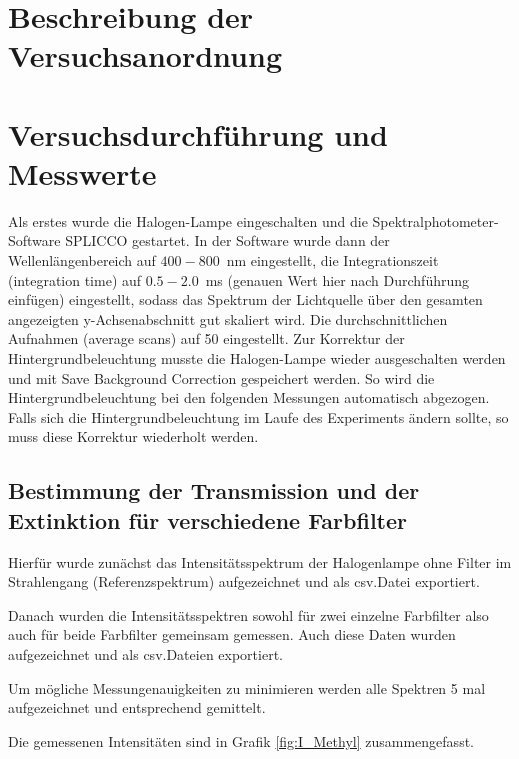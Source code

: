 \documentclass{article}
\begin{document}
\section{Beschreibung der Versuchsanordnung}

\section{Versuchsdurchführung und Messwerte}

Als erstes wurde die Halogen-Lampe eingeschalten und die Spektralphotometer-Software SPLICCO gestartet. In der Software wurde dann der Wellenlängenbereich auf $400-800$~nm eingestellt, die Integrationszeit (integration time) auf $0.5-2.0$~ms (genauen Wert hier nach Durchführung einfügen) eingestellt, sodass das Spektrum der Lichtquelle über den gesamten angezeigten y-Achsenabschnitt gut skaliert wird. Die durchschnittlichen Aufnahmen (average scans) auf 50 eingestellt.
Zur Korrektur der Hintergrundbeleuchtung musste die Halogen-Lampe wieder ausgeschalten werden und mit Save Background Correction gespeichert werden. So wird die Hintergrundbeleuchtung bei den folgenden Messungen automatisch abgezogen. Falls sich die Hintergrundbeleuchtung im Laufe des Experiments ändern sollte, so muss diese Korrektur wiederholt werden.


\subsection{Bestimmung der Transmission und der Extinktion für verschiedene Farbfilter}

Hierfür wurde zunächst das Intensitätsspektrum der Halogenlampe ohne Filter im Strahlengang (Referenzspektrum) aufgezeichnet und als csv.Datei exportiert.

Danach wurden die Intensitätsspektren sowohl für zwei einzelne Farbfilter also auch für beide Farbfilter gemeinsam gemessen. Auch diese Daten wurden aufgezeichnet und als csv.Dateien exportiert.

Um mögliche Messungenauigkeiten zu minimieren werden alle Spektren 5 mal aufgezeichnet und entsprechend gemittelt.

Die gemessenen Intensitäten sind in Grafik \ref{fig:I_Methyl} zusammengefasst.
\end{document}
